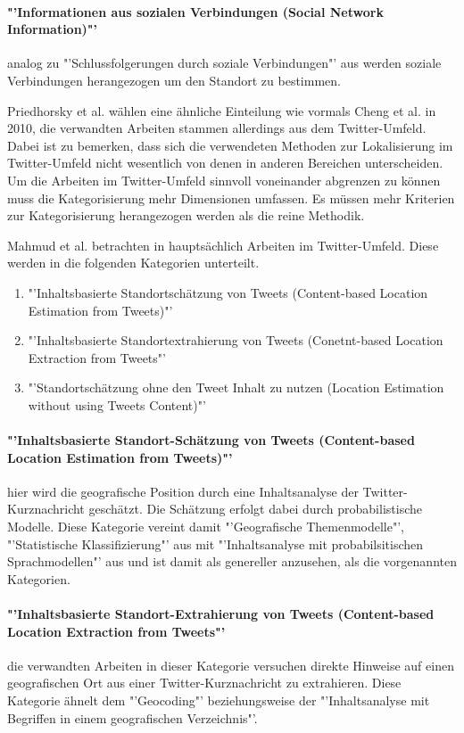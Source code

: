 		\paragraph*{"'Informationen aus sozialen Verbindungen (Social Network Information)"'} analog zu "'Schlussfolgerungen durch soziale Verbindungen"' aus \cite{Cheng2010} werden soziale Verbindungen herangezogen um den Standort zu bestimmen. 

		Priedhorsky et al. wählen eine ähnliche Einteilung wie vormals Cheng et al. in 2010, die verwandten Arbeiten stammen allerdings aus dem Twitter-Umfeld. 
		Dabei ist zu bemerken, dass sich die verwendeten Methoden zur Lokalisierung im Twitter-Umfeld nicht wesentlich von denen in anderen Bereichen unterscheiden. 
		Um die Arbeiten im Twitter-Umfeld sinnvoll voneinander abgrenzen zu können muss die Kategorisierung mehr Dimensionen umfassen. 
		Es müssen mehr Kriterien zur Kategorisierung herangezogen werden als die reine Methodik.   

		Mahmud et al. betrachten in \cite{Mahmud2012} hauptsächlich Arbeiten im Twitter-Umfeld. 
		Diese werden in die folgenden Kategorien unterteilt. 

		\begin{enumerate}
			\item  "'Inhaltsbasierte Standortschätzung von Tweets (Content-based Location Estimation from Tweets)"'
			\item "'Inhaltsbasierte Standortextrahierung von Tweets (Conetnt-based Location Extraction from Tweets"'
			\item "'Standortschätzung ohne den Tweet Inhalt zu nutzen (Location Estimation without using Tweets Content)"'
		\end{enumerate}

		\paragraph*{"'Inhaltsbasierte Standort-Schätzung von Tweets (Content-based Location Estimation from Tweets)"'} hier wird die geografische Position durch eine Inhaltsanalyse der Twitter-Kurznachricht geschätzt. 
		Die Schätzung erfolgt dabei durch probabilistische Modelle.
		Diese Kategorie vereint damit "'Geografische Themenmodelle"', "'Statistische Klassifizierung"' aus \cite{Priedhorsky2013} mit "'Inhaltsanalyse mit probabilsitischen Sprachmodellen"' aus \cite{Cheng2010} und ist damit als genereller anzusehen, als die vorgenannten Kategorien. 

		\paragraph*{"'Inhaltsbasierte Standort-Extrahierung von Tweets (Content-based Location Extraction from Tweets"'} die verwandten Arbeiten in dieser Kategorie versuchen direkte Hinweise auf einen geografischen Ort aus einer Twitter-Kurznachricht zu extrahieren. 
		Diese Kategorie ähnelt dem "'Geocoding"' beziehungsweise der "'Inhaltsanalyse mit Begriffen in einem geografischen Verzeichnis"'. 

